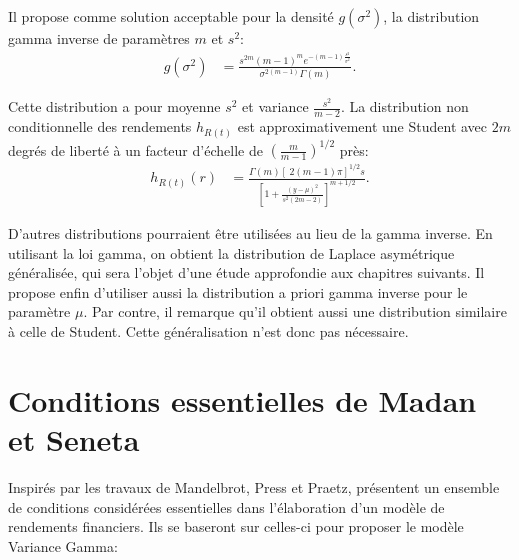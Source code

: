 Il propose comme solution acceptable pour la densité $g(\sigma^2)$, la
distribution gamma inverse de paramètres $m$ et $s^2$:
\begin{align}
  \label{eq:gpraetz}
  g(\sigma^2) &=
  \frac{s^{2m}(m-1)^me^{-(m-1)\frac{s^2}{\sigma^2}}}{\sigma^{2(m-1)}\Gamma(m)}.
\end{align}

Cette distribution a pour moyenne $s^2$ et variance $\frac{s^2}{m-2}$.
La distribution non conditionnelle des rendements $h_{R(t)}$ est
approximativement une Student avec $2m$ degrés de liberté à un facteur
d'échelle de $\left(\frac{m}{m-1}\right)^{1/2}$ près:
\begin{align}
  \label{eq:hpraetz}
  h_{R(t)}(r) &= \frac{\Gamma(m)\left[\ 2(m-1)\pi
    \right]^{1/2}s}{\left[1+\frac{(y-\mu)^2}{s^2(2m-2)}
    \right]^{m+1/2}}.
\end{align}

D'autres distributions pourraient être utilisées au lieu de la gamma
inverse. En utilisant la loi gamma, on obtient la distribution de
Laplace asymétrique généralisée, qui sera l'objet d'une étude
approfondie aux chapitres suivants. Il propose enfin d'utiliser aussi
la distribution a priori gamma inverse pour le paramètre $\mu$. Par
contre, il remarque qu'il obtient aussi une distribution similaire à
celle de Student. Cette généralisation n'est donc pas nécessaire.

\section{Conditions essentielles de Madan et Seneta}
\label{sec:madanseneta90}

Inspirés par les travaux de Mandelbrot, Press et Praetz,
\cite{madan1990variance} présentent un ensemble de conditions
considérées essentielles dans l'élaboration d'un modèle de rendements
financiers. Ils se baseront sur celles-ci pour proposer le modèle
Variance Gamma:

